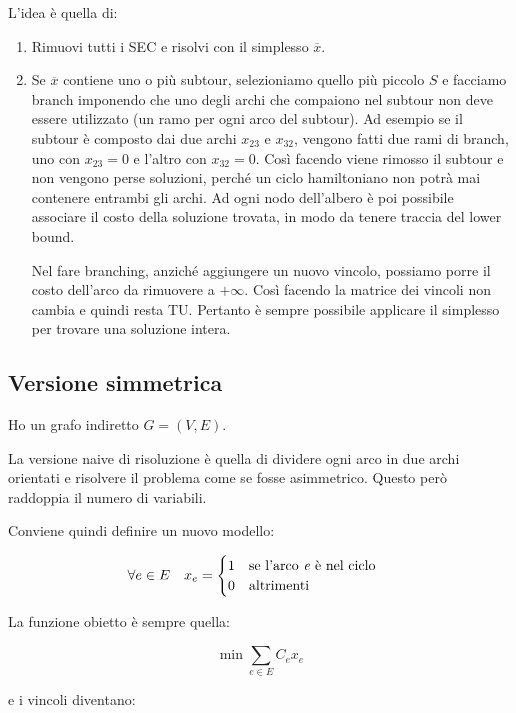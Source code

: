 L'idea è quella di:
\begin{enumerate}
	\item Rimuovi tutti i SEC e risolvi con il simplesso $\overline{x}$.
	\item Se $\overline{x}$ contiene uno o più subtour, selezioniamo quello più piccolo $S$ e facciamo branch imponendo che uno degli archi che compaiono nel subtour non deve essere utilizzato (un ramo per ogni arco del subtour). Ad esempio se il subtour è composto dai due archi $x_{23}$ e $x_32$, vengono fatti due rami di branch, uno con $x_{23} =0$ e l'altro con $x_{32} = 0$. Così facendo viene rimosso il subtour e non vengono perse soluzioni, perché un ciclo hamiltoniano non potrà mai contenere entrambi gli archi. Ad ogni nodo dell'albero è poi possibile associare il costo della soluzione trovata, in modo da tenere traccia del lower bound.
	
	Nel fare branching, anziché aggiungere un nuovo vincolo, possiamo porre il costo dell'arco da rimuovere a $+\infty$. Così facendo la matrice dei vincoli non cambia e quindi resta TU. Pertanto è sempre possibile applicare il simplesso per trovare una soluzione intera.
\end{enumerate}

\subsection{Versione simmetrica}

Ho un grafo indiretto $G = (V,E)$.

La versione naive di risoluzione è quella di dividere ogni arco in due archi orientati e risolvere il problema come se fosse asimmetrico. Questo però raddoppia il numero di variabili.

Conviene quindi definire un nuovo modello:

$$
\forall e \in E \quad x_e = \begin{cases}
1 \quad \text{se l'arco \textit{e} è nel ciclo} \\
0 \quad \text{altrimenti}
\end{cases}
$$

La funzione obietto è sempre quella:

$$
\min \sum_{e \in E} C_e x_e
$$

e i vincoli diventano:

